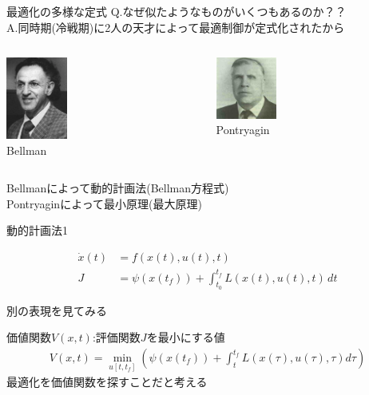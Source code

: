 \documentclass[dvipdfmx,12pt]{beamer}
\begin{document}
    \begin{frame}{最適化の多様な定式}
        Q.なぜ似たようなものがいくつもあるのか？？\\

        A.同時期(冷戦期)に2人の天才によって最適制御が定式化されたから\\

        \begin{columns}

            \begin{column}{0.5\textwidth}
                \centering
                \includegraphics[clip, width = 2.0cm]{Bellman.png}\\
                {\tiny Bellman}
            \end{column}
        
            \begin{column}{0.5\textwidth}
                \centering
                \includegraphics[clip, width = 2.0cm]{Pontryagin.png}\\
                {\tiny Pontryagin}
            \end{column}
        \end{columns}

        Bellmanによって動的計画法(Bellman方程式)\\

        Pontryaginによって最小原理(最大原理)\\

    \end{frame}

    \begin{frame}{動的計画法1}
        \footnotesize
        \begin{tcolorbox}[title=最適制御]
            \begin{align*}
                \dot{x}(t) &= f(x(t), u(t), t) \\
                J &= \psi(x(t_f)) + \int_{t_0}^{t_f} L(x(t), u(t), t) \, dt
            \end{align*}
        \end{tcolorbox}
        
    
        別の表現を見てみる
    
        価値関数$V(x, t)$:評価関数$J$を最小にする値\\
        \begin{align*}
            V(x, t) = \min_{u[t, t_f]} \left( \psi(x(t_f)) + \int_t^{t_f} L(x(\tau), u(\tau), \tau) d\tau \right)
        \end{align*}
        最適化を価値関数を探すことだと考える
    
    \end{frame}
\end{document}
